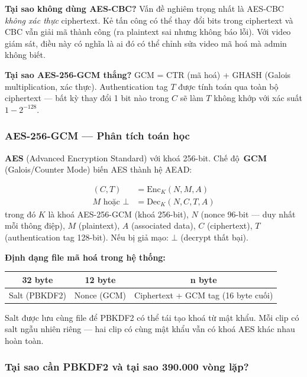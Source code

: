 \textbf{Tại sao không dùng AES-CBC?} Vấn đề nghiêm trọng nhất là AES-CBC \textit{không xác thực} ciphertext. Kẻ tấn công có thể thay đổi bits trong ciphertext và CBC vẫn giải mã thành công (ra plaintext sai nhưng không báo lỗi). Với video giám sát, điều này có nghĩa là ai đó có thể chỉnh sửa video mã hoá mà admin không biết.

\textbf{Tại sao AES-256-GCM thắng?} GCM = CTR (mã hoá) + GHASH (Galois multiplication, xác thực). Authentication tag $T$ được tính toán qua toàn bộ ciphertext --- bất kỳ thay đổi 1 bit nào trong $C$ sẽ làm $T$ không khớp với xác suất $1 - 2^{-128}$.

\subsubsection{AES-256-GCM --- Phân tích toán học}
\label{subsubsec:aesgcm}

\textbf{AES} (Advanced Encryption Standard) \cite{nist_aes} với khoá 256-bit. Chế độ~\textbf{GCM} (Galois/\allowbreak{}Counter Mode) biến AES thành hệ AEAD:

{\small
\begin{align}
    (C, T) &= \mathrm{Enc}_{K}(N, M, A) \\
    M \text{ hoặc } \bot &= \mathrm{Dec}_{K}(N, C, T, A)
\end{align}
}
trong đó $K$ là khoá AES-256-GCM (khoá 256-bit), $N$ (nonce 96-bit --- duy nhất mỗi thông điệp), $M$ (plaintext), $A$ (associated data), $C$ (ciphertext), $T$ (authentication tag 128-bit). Nếu bị giả mạo: $\bot$ (decrypt thất bại).

\medskip
\textbf{Định dạng file mã hoá trong hệ thống:}
\begin{center}
\begin{tabular}{|c|c|c|}
\hline
\textbf{32 byte} & \textbf{12 byte} & \textbf{n byte} \\
\hline
Salt (PBKDF2) & Nonce (GCM) & Ciphertext + GCM tag (16 byte cuối) \\
\hline
\end{tabular}
\end{center}

Salt được lưu cùng file để PBKDF2 có thể tái tạo khoá từ mật khẩu. Mỗi clip có salt ngẫu nhiên riêng --- hai clip có cùng mật khẩu vẫn có khoá AES khác nhau hoàn toàn.

\subsubsection{Tại sao cần PBKDF2 và tại sao 390.000 vòng lặp?}
\label{subsubsec:pbkdf2}


